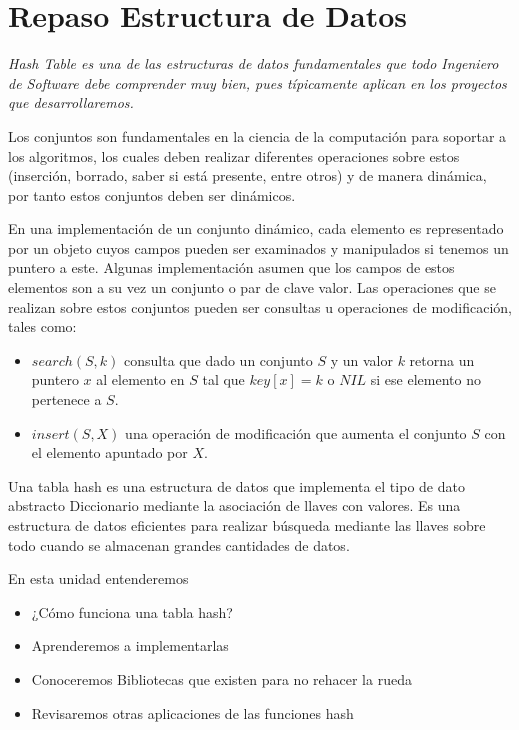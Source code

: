 \chapter*{Repaso Estructura de Datos}
\vspace{140px}
\begin{flushright}
    \textit{Hash Table es una de las estructuras de datos fundamentales que todo Ingeniero de Software debe comprender muy bien, pues típicamente aplican en los proyectos que desarrollaremos. 
}
\end{flushright}


Los conjuntos son fundamentales en la ciencia de la computación para soportar a los algoritmos, los cuales deben realizar diferentes operaciones sobre estos (inserción, borrado, saber si está presente, entre otros) y de manera dinámica, por tanto estos conjuntos deben ser dinámicos.

En una implementación de un conjunto dinámico, cada elemento es representado por un objeto cuyos campos pueden ser examinados y manipulados si tenemos un puntero a este. Algunas implementación asumen que los campos de estos elementos son a su vez un conjunto o par de clave valor. Las  operaciones que se realizan sobre estos conjuntos pueden ser consultas u operaciones de modificación, tales como:
\begin{itemize}
\item $search(S,k)$ consulta que dado un conjunto $S$ y un valor $k$ retorna un puntero $x$ al elemento en $S$ tal que $key[x]=k$ o $NIL$ si ese elemento no pertenece a $S$. \item $insert(S,X)$ una operación de modificación que aumenta el conjunto $S$ con el elemento apuntado por $X$.  
\end{itemize}

Una tabla hash es una estructura de datos que implementa el tipo de dato abstracto Diccionario mediante la asociación de llaves con valores. Es una estructura de datos eficientes para realizar búsqueda mediante las llaves sobre todo cuando se almacenan grandes cantidades de datos. 


En esta unidad entenderemos
\begin{itemize}
\item  ¿Cómo funciona una tabla hash?
\item Aprenderemos a implementarlas
\item Conoceremos  Bibliotecas que existen para no rehacer la rueda
\item Revisaremos otras aplicaciones de las funciones hash
\end{itemize}

